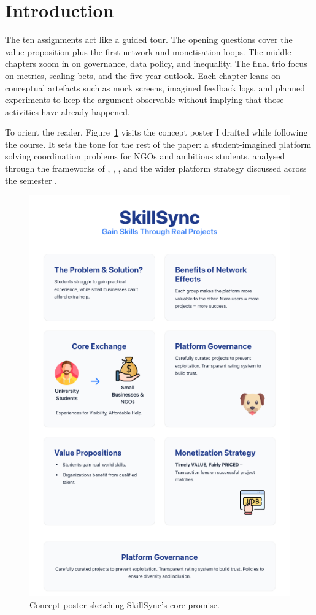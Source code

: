 \documentclass[12pt,a4paper]{article}
\begin{document}
\newpage

\vspace*{\baselineskip}
\tableofcontents
\newpage

\section*{Introduction}
The ten assignments act like a guided tour. The opening questions cover the value proposition plus the first network and monetisation loops. The middle chapters zoom in on governance, data policy, and inequality. The final trio focus on metrics, scaling bets, and the five-year outlook. Each chapter leans on conceptual artefacts such as mock screens, imagined feedback logs, and planned experiments to keep the argument observable without implying that those activities have already happened.

To orient the reader, Figure~\ref{fig:intro-showcase} visits the concept poster I drafted while following the course. It sets the tone for the rest of the paper: a student-imagined platform solving coordination problems for NGOs and ambitious students, analysed through the frameworks of \citet{Choudary2016}, \citet{Srnicek2017}, \citet{Reillier2017}, and the wider platform strategy  discussed across the semester \citep{Lecture01,Lecture03,Lecture05}.

\begin{figure}[H]
  \centering
  \includegraphics[width=0.5\linewidth]{figures/Poster.png}
  \caption{Concept poster sketching SkillSync's core promise.}
  \label{fig:intro-showcase}
\end{figure}













\newpage


\end{document}
